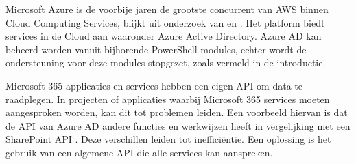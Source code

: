 \begin{comment}
Azure biedt ondersteuning aan voor verschillende niet Microsoft-gerelateerde Infrastructure Automation tools. Configuration Management tools zoals Ansible, Chef en Puppet werden al onderzocht en onderling vergeleken in andere studies \autocite{Microsoft2022a}. 

Ansible biedt goede ondersteuning aan op \newline lange termijn en is simpel in gebruik met goede documentatie. Daarnaast is Ansible een krachtige tool met veel potentieel \autocite{Masek2018}. Het wordt eerder aangeraden voor kleinere projecten door zijn onvolledigheid. Waarbij Chef en Puppet meer compleet zijn en grote projecten beter kan verwerken \autocite{Bertram2016}. 

Naast bovenstaande tools ondersteunt Azure Orchestration tools waaronder Terraform. Deze tool is onveranderlijk ten opzichte van Configuration Management tools. Terraform wordt gebruikt om machines te orkestreren wat eenvoudiger is om meerdere instanties te voorzien. Terwijl Configuration Management tools zich focussen op het configureren van instanties \autocite{Brikman2016}.

Binnen Hogeschool Gent zijn er reeds een aantal studies uitgevoerd naar aspecten die voorkomen in dit onderwerp. Kelvin \textcite{Vermeulen2021} heeft een onderzoek uitgevoerd naar het automatiseren van een Public Cloud-omgeving binnen AWS. Daarnaast heeft Joachim \textcite{VandeKeere2021} een studie uitgevoerd naar het gebruik van Ansible binnen lokale omgevingen. 

In het eerste onderzoek van Vermeulen werd de configuratie van AWS manueel uitgevoerd. Vervolgens werd in het tweede onderzoek van Van der Keere Ansible gebruikt voor een lokale \newline Windows- en Linux-omgeving. In deze studie worden de configuraties van Azure geautomatiseerd. Verder wordt er een Linux-testomgeving opgezet in de Cloud via Ansible.

\end{comment}

Microsoft Azure is de voorbije jaren de grootste concurrent van AWS binnen Cloud Computing Services, blijkt uit onderzoek van \textcite{Vailshery2022} en \textcite{SRG2022}. Het platform biedt services in de Cloud aan waaronder Azure Active Directory. Azure AD kan beheerd worden vanuit bijhorende PowerShell modules, echter wordt de ondersteuning voor deze modules stopgezet, zoals vermeld in de introductie. 

Microsoft 365 applicaties en services hebben een eigen API om data te raadplegen. In projecten of applicaties waarbij  Microsoft 365 services moeten aangesproken worden, kan dit tot problemen leiden. Een voorbeeld hiervan is dat de API van Azure AD andere functies en werkwijzen heeft in vergelijking met een SharePoint API \autocite{VanRousselt2021}. Deze verschillen leiden tot inefficiëntie. Een oplossing is het gebruik van een algemene API die alle services kan aanspreken.

